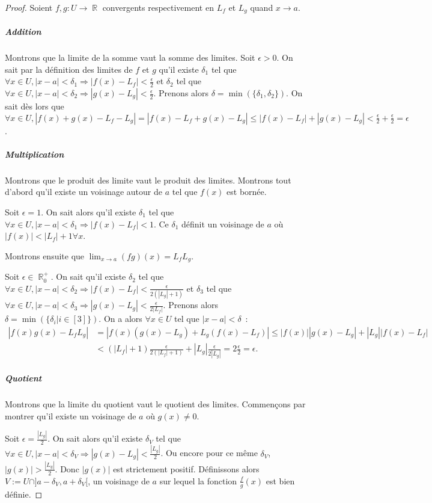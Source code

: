 \documentclass{article}
\DeclareMathOperator{\R}{\mathbb R}
\theoremstyle{definition}
\theoremstyle{remark}
\begin{document}
			\begin{proof} Soient $f, g : U \to \R$ convergents respectivement en $L_f$ et $L_g$ quand $x \to a$.

			\subparagraph{Addition} Montrons que la limite de la somme vaut la somme des limites.
			Soit $\epsilon > 0$. On sait par la définition des limites de $f$ et $g$ qu'il existe $\delta_1$ tel que $\forall x \in U, |x-a| < \delta_1
			\Rightarrow |f(x) - L_f| < \frac \epsilon2$
			et $\delta_2$ tel que $\forall x \in U, |x-a| < \delta_2 \Rightarrow |g(x)-L_g| < \frac \epsilon2$. Prenons alors $\delta = \min(\{\delta_1, \delta_2\})$.
			On sait dès lors que $\forall x \in U, |f(x) + g(x) - L_f - L_g| = |f(x)-L_f + g(x)-L_g| \leq |f(x)-L_f| + |g(x)-L_g| < \frac \epsilon2 + \frac \epsilon2 =
			\epsilon$.

			\subparagraph{Multiplication} Montrons que le produit des limite vaut le produit des limites. Montrons tout d'abord qu'il existe un voisinage autour de $a$
			tel que $f(x)$ est bornée.

			Soit $\epsilon = 1$. On sait alors qu'il existe $\delta_1$ tel que $\forall x \in U, |x-a| < \delta_1 \Rightarrow |f(x) - L_f| < 1$. Ce $\delta_1$
			définit un voisinage de $a$ où $|f(x)| < |L_f| + 1 \forall x$.

			Montrons ensuite que $\lim_{x \to a}(fg)(x) = L_fL_g$.

			Soit $\epsilon \in \R_0^+$. On sait qu'il existe $\delta_2$ tel que $\forall x \in U, |x-a| < \delta_2 \Rightarrow |f(x)-L_f| < \frac {\epsilon}{2(|L_g|+1)}$
			et $\delta_3$ tel que $\forall x \in U, |x-a| < \delta_3 \Rightarrow |g(x)-L_g| < \frac {\epsilon}{2|L_f|}$. Prenons alors
			$\delta = \min(\{\delta_i | i \in [3]\})$. On a alors $\forall x \in U$ tel que $|x-a| < \delta$~:
			\[\begin{aligned}
				|f(x)g(x) - L_fL_g| &= |f(x)(g(x) - L_g) + L_g(f(x) - L_f)| \leq |f(x)||g(x) - L_g| + |L_g||f(x) - L_f| \\
									&< (|L_f| + 1)\frac {\epsilon}{2(|L_f|+1)} + |L_g|\frac {\epsilon}{2|L_g|} = 2\frac {\epsilon}{2} = \epsilon.
			\end{aligned}\]

			\subparagraph{Quotient} Montrons que la limite du quotient vaut le quotient des limites. Commençons par montrer qu'il existe un voisinage de $a$ où
			$g(x) \neq 0$.

			Soit $\epsilon = \frac {|L_g|}2$. On sait alors qu'il existe $\delta_V$ tel que $\forall x \in U, |x-a| < \delta_V \Rightarrow |g(x)-L_g| < \frac {|L_g|}2$.
			Ou encore pour ce même $\delta_V$, $|g(x)| > \frac {|L_g|}2$. Donc $|g(x)|$ est strictement positif. Définissons alors $V := U \cap ]a-\delta_V, a+\delta_V[$,
			un voisinage de $a$ sur lequel la fonction $\frac fg(x)$ est bien définie.
			

\end{proof}
\end{document}
